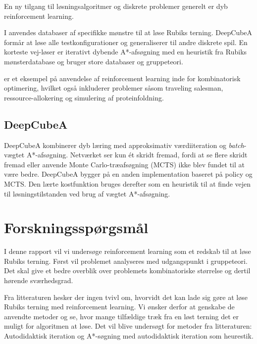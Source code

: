 \documentclass[../main.tex]{subfiles}
\begin{document}
En ny tilgang til løsningsalgoritmer og diskrete problemer generelt er dyb reinforcement learning. 


I \cite{SolvingNature} anvendes databaser af specifikke mønstre til at løse Rubiks terning. DeepCubeA formår at løse alle testkonfigurationer og generaliserer til andre diskrete spil. En korteste vej-løser er iterativt dybende A*-afsøgning med en heuristik fra Rubiks mønsterdatabase og bruger store databaser og gruppeteori. 
 
\cite{RubiksMedium} er et eksempel på anvendelse af reinforcement learning inde for kombinatorisk optimering, hvilket også inkluderer problemer såsom traveling salesman, ressource-allokering og simulering af proteinfoldning. 

\subsection{DeepCubeA}
DeepCubeA \cite{SolvingNature} kombinerer dyb læring med approksimativ værdiiteration og \emph{batch}-vægtet A*-afsøgning.
Netværket ser kun ét skridt fremad, fordi at se flere skridt fremad eller anvende Monte Carlo-træafsøgning (MCTS) ikke blev fundet til at være bedre.
DeepCubeA bygger på en anden implementation baseret på policy og MCTS.
Den lærte kostfunktion bruges derefter som en heuristik til at finde vejen til løsningstilstanden ved brug af vægtet A*-afsøgning.


\section{Forskningsspørgsmål}
I denne rapport vil vi undersøge reinforcement learning som et redskab til at løse Rubiks terning.
Først vil problemet analyseres med udgangspunkt i gruppeteori.
Det skal give et bedre overblik over problemets kombinatoriske størrelse og dertil hørende sværhedsgrad.

Fra litteraturen hesker der ingen tvivl om, hvorvidt det kan lade sig gøre at løse Rubiks terning med reinforcement learning.
Vi ønsker derfor at genskabe de anvendte metoder og se, hvor mange tilfældige træk fra en løst terning det er muligt for algoritmen at løse.
Det vil blive undersøgt for metoder fra litteraturen: Autodidaktisk iteration \cite{HumansBeGone} og A*-søgning med autodidaktisk iteration som heurestik.

 
\end{document}
